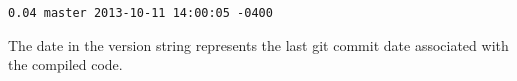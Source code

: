 \begin{lstlisting}
0.04 master 2013-10-11 14:00:05 -0400
\end{lstlisting}

The date in the version string represents the last git commit date associated with the compiled code.

%
%
%
%
%
%
%
%
